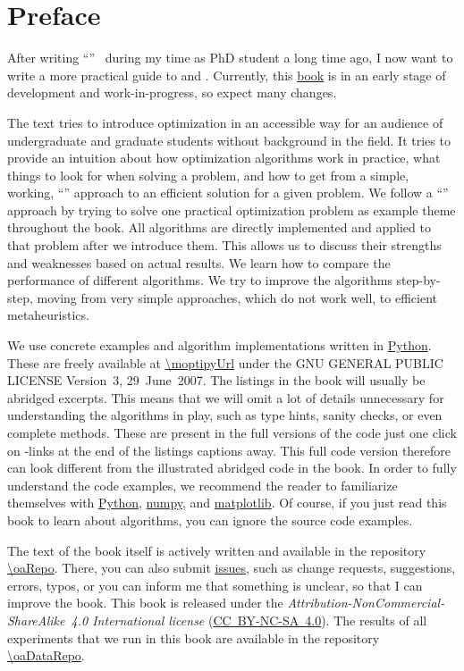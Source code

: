 \section*{Preface}%
%
After writing ``''~\cite{W2009GOATAA} during my time as PhD student a long time ago, I now want to write a more practical guide to  and .
Currently, this \href{\oaUrl/index.html}{book} is in an early stage of development and work-in-progress, so expect many changes.

The text tries to introduce optimization in an accessible way for an audience of undergraduate and graduate students without background in the field.
It tries to provide an intuition about how optimization algorithms work in practice, what things to look for when solving a problem, and how to get from a simple, working, ``'' approach to an efficient solution for a given problem.
We follow a ``'' approach by trying to solve one practical optimization problem as example theme throughout the book.
All algorithms are directly implemented and applied to that problem after we introduce them.
This allows us to discuss their strengths and weaknesses based on actual results.
We learn how to compare the performance of different algorithms.
We try to improve the algorithms step-by-step, moving from very simple approaches, which do not work well, to efficient metaheuristics.

We use concrete examples and algorithm implementations written in \href{https://python.org}{Python}.
These are freely available at \url{\moptipyUrl} under the GNU GENERAL PUBLIC LICENSE Version~3, 29~June~2007.
The listings in the book will usually be abridged excerpts.
This means that we will omit a lot of details unnecessary for understanding the algorithms in play, such as type hints, sanity checks, or even complete methods.
These are present in the full versions of the code just one click on -links at the end of the listings captions away.
This full code version therefore can look different from the illustrated abridged code in the book.
In order to fully understand the code examples, we recommend the reader to familiarize themselves with \href{https://python.org}{Python}, \href{https://numpy.org/}{numpy}, and \href{https://matplotlib.org/}{matplotlib}.
Of course, if you just read this book to learn about algorithms, you can ignore the source code examples. 

The text of the book itself is actively written and available in the repository \url{\oaRepo}.
There, you can also submit \href{\oaRepo/issues}{issues}, such as change requests, suggestions, errors, typos, or you can inform me that something is unclear, so that I can improve the book. 
This book is released under the \emph{Attribution-NonCommercial-ShareAlike~4.0 International license} (\href{http://creativecommons.org/licenses/by-nc-sa/4.0/}{\mbox{CC~BY-NC-SA~4.0}}).
The results of all experiments that we run in this book are available in the repository \url{\oaDataRepo}.

